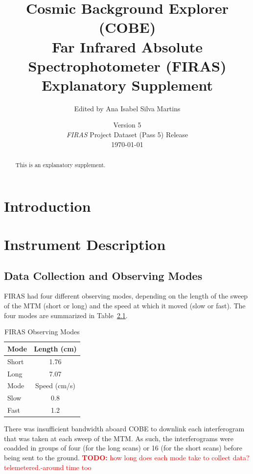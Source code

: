 \documentclass[notitlepage]{report}
\title{Cosmic Background Explorer (COBE)\\Far Infrared Absolute Spectrophotometer (FIRAS)\\ Explanatory Supplement}
\author{Edited by Ana Isabel Silva Martins}
\date{Version 5\\\textit{FIRAS} Project Dataset (Pass 5) Release\\\today}
\newcommand{\todo}[1]{\textcolor{red}{\textbf{TODO:} #1}}
\begin{document}
\begin{titlingpage}
    \maketitle
    \begin{abstract}
        This is an explanatory supplement.
    \end{abstract}
\end{titlingpage}

\tableofcontents

\newpage

\chapter{Introduction}

\chapter{Instrument Description}

\section{Data Collection and Observing Modes}

FIRAS had four different observing modes, depending on the length of the sweep of the MTM (short or long) and the speed at which it moved (slow or fast). The four modes are summarized in Table~\ref{tab:observing_modes}.

\begin{table}[ht]
\centering
\caption{FIRAS Observing Modes}\label{tab:observing_modes}
\begin{tabular}{lc}
Mode  & Length (cm)  \\ \hline
Short & 1.76         \\
Long  & 7.07         \\ \hline
Mode  & Speed (cm/s) \\ \hline
Slow  & 0.8          \\
Fast  & 1.2          \\ \hline
\end{tabular}
\end{table}

There was insufficient bandwidth aboard COBE to downlink each interferogram that was taken at each sweep of the MTM\@. As such, the interferograms were coadded in groups of four (for the long scans) or 16 (for the short scans) before being sent to the ground. \todo{how long does each mode take to collect data? telemetered.\@turn-around time too}
\end{document}
